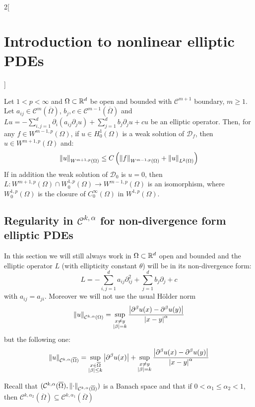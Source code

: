\documentclass[../../../main_math.tex]{subfiles}
\begin{document}
\begin{multicols}{2}[\section{Introduction to nonlinear elliptic PDEs}]
  \begin{theorem}
    Let $1<p<\infty$ and $\Omega\subset\mathbb{R}^d$ be open and bounded with $\mathcal{C}^{m+1}$ boundary, $m\geq 1$. Let $a_{ij}\in \mathcal{C}^m(\overline{\Omega})$, $b_j,c\in \mathcal{C}^{m-1}(\overline{\Omega})$ and $Lu=-\sum_{i,j=1}^d \partial_i(a_{ij}\partial_j u)+\sum_{j=1}^d b_j\partial_j u+cu$ be an elliptic operator. Then, for any $f\in W^{m-1,p}(\Omega)$, if $u\in H^1_0(\Omega)$ is a weak solution of $\mathcal{D}_f$, then $u\in W^{m+1,p}(\Omega)$ and:
    $$
      \left\|u\right\|_{W^{m+1,p}(\Omega)}\leq C\left(\left\|f\right\|_{W^{m-1,p}(\Omega)}+\left\|u\right\|_{L^2(\Omega)}\right)
    $$
    If in addition the weak solution of $\mathcal{D}_0$ is $u=0$, then $L:W^{m+1,p}(\Omega)\cap W_0^{1,p}(\Omega)\to W^{m-1,p}(\Omega)$ is an isomorphism, where $W_0^{1,p}(\Omega)$ is the closure of $C_0^\infty(\Omega)$ in $W^{1,p}(\Omega)$.
  \end{theorem}
  \subsection{Regularity in \texorpdfstring{$\mathcal{C}^{k,\alpha}$}{Ckalpha} for non-divergence form elliptic PDEs}

  In this section we will still always work in $\Omega\subset\mathbb{R}^d$ open and bounded and the elliptic operator $L$ (with ellipticity constant $\theta$) will be in its non-divergence form:
  $$
    L=-\sum_{i,j=1}^d a_{ij}\partial_{ij}^2+\sum_{j=1}^d b_j\partial_j+c
  $$
  with $a_{ij}=a_{ji}$.  Moreover we will not use the usual Hölder norm
  $$
    \left\|u\right\|_{\mathcal{C}^{k,\alpha}(\Omega)}=\sup_{\substack{x\ne y\\ \abs{\beta}=k}}\frac{\abs{\partial^\beta u(x)-\partial^\beta u(y)}}{\abs{x-y}^\alpha}
  $$
  but the following one:
  $$
    \left\|u\right\|_{\mathcal{C}^{k,\alpha}(\overline\Omega)}=\sup_{\substack{x\in \overline\Omega\\ \abs{\beta}\leq k}}\abs{\partial^\beta u(x)}+\sup_{\substack{x\ne y\\ \abs{\beta}=k}}\frac{\abs{\partial^\beta u(x)-\partial^\beta u(y)}}{\abs{x-y}^\alpha}
  $$

  \begin{remark}
    Recall that $(\mathcal{C}^{k,\alpha}(\overline\Omega),\left\|\cdot\right\|_{\mathcal{C}^{k,\alpha}(\overline\Omega)})$ is a Banach space and that if $0<\alpha_1\leq\alpha_2<1$, then $
      \mathcal{C}^{k,\alpha_2}(\overline{\Omega})\subseteq \mathcal{C}^{k,\alpha_1}(\overline{\Omega})$
  \end{remark}


\end{multicols}
\end{document}
